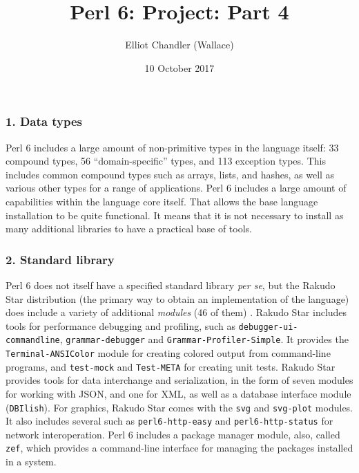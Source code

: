 \documentclass[14pt,english]{extarticle}
\begin{document}
\title{Perl 6: Project: Part 4}


\author{Elliot Chandler (Wallace)}


\date{10 October 2017}

\maketitle

\subsubsection*{1. Data types}

Perl 6 includes a large amount of non-primitive types in the language
itself: 33 compound types, 56 ``domain-specific'' types, and 113
exception types. This includes common compound types such as arrays,
lists, and hashes, as well as various other types for a range of applications.
Perl 6 includes a large amount of capabilities within the language
core itself. That allows the base language installation to be quite
functional. It means that it is not necessary to install as many additional
libraries to have a practical base of tools.


\subsubsection*{2. Standard library}

Perl 6 does not itself have a specified standard library \emph{per
se}, but the Rakudo Star distribution (the primary way to obtain an
implementation of the language) does include a variety of additional
\emph{modules} (46 of them) \cite{New1}. Rakudo Star includes tools
for performance debugging and profiling, such as \texttt{debugger-ui-commandline},
\texttt{grammar-debugger} and \texttt{Grammar-Profiler-Simple}. It
provides the \texttt{Terminal-ANSIColor} module for creating colored
output from command-line programs, and \texttt{test-mock} and \texttt{Test-META}
for creating unit tests. Rakudo Star provides tools for data interchange
and serialization, in the form of seven modules for working with JSON,
and one for XML, as well as a database interface module (\texttt{DBIlish}).
For graphics, Rakudo Star comes with the \texttt{svg} and \texttt{svg-plot}
modules. It also includes several such as \texttt{perl6-http-easy}
and \texttt{perl6-http-status} for network interoperation. Perl 6
includes a package manager module, also, called \texttt{zef}, which
provides a command-line interface for managing the packages installed
in a system.
\end{document}
